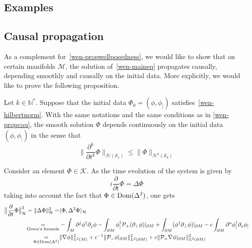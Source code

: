 \subsection{Examples}
\subsection{Causal propagation}\label{wen-subsect-causal}
As a complement for~\cref{wen-propwellposedness},
we would like to show that on certain manifolds $\mathcal{M}$, 
the solution of~\cref{wen-maineq} propagates causally, \ie depending smoothly and causally on the initial data.
More explicitly, 
we would like to prove the following proposition.
\begin{proposition}
Let $k \in \mathbb{N}^*$.
Suppose that the initial data $\Phi_0 = (\phi, \phi_|)$ satisfies~\cref{wen-hilbertnorm}.
With the same notations and the same conditions as in \cref{wen-propcau}, 
the smooth solution $\Phi$ depends continuously on the initial data $(\phi, \phi_|)$ in the sense that
\begin{equation*}
\big\| \frac{\partial^k}{\partial t^k} \Phi\big\|_{\mathcal{H}(\mathcal{S}_1)}
\leq
\big\| \Phi\big\|_{\mathcal{H}^{k}(\mathcal{S}_0)}
\end{equation*}
\end{proposition}
Consider an element $\Phi \in \mathcal{K}$.
As the time evolution of the system is given by
\begin{equation*}
i \frac{\partial }{\partial t} \Phi = \Delta \Phi 
\end{equation*}
taking into account the fact that $\Phi\in\mathrm{Dom}(\Delta^2)$, one gets
\begin{equation}\label{wen-tobebounded}
\begin{split}
\big\| \frac{\partial }{\partial t} \Phi \big\|^2_\mathcal{H} = \| \Delta \Phi \|^2_{\mathcal{H}}  = &
\langle \Phi, \Delta^2 \Phi \rangle_{\mathcal{H}}   \\ 
\underset{\textrm{Green's formula}}=
& - \int_M \partial^j \phi^\dagger \partial_j \phi 
 -  \int_{\partial M}\phi_|^\dagger \mathcal{P}_+(\partial_\bot \phi)\vert_{\partial M} 
 + \int_{\partial M} (\phi^\dagger \partial_\bot\phi)\vert_{\partial M}
- c\int_{\partial M} \partial^a \phi^\dagger_| \partial_a \phi_| \\
\underset{\Phi \in \mathrm{Dom}(\Delta^2)}{=} &
\|\nabla \phi \|^2_{L^2 (M)} + c^{-1} \| \mathcal{P}_- \phi\vert_{\partial M} \|^2_{L^2(\partial M)}
+ c \| \mathcal{P}_+ \nabla \phi\vert_{\partial M} \|^2_{L^2(\partial M)}
\end{split}
\end{equation}

